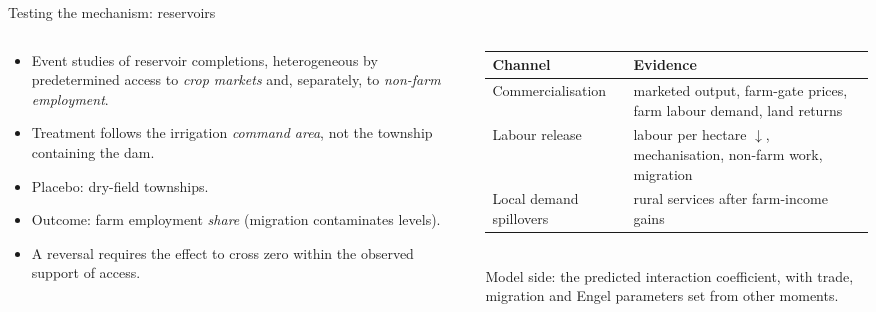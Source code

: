 \documentclass[10pt,aspectratio=169]{beamer}
\newcommand{\hl}[1]{\textcolor{mOrange}{#1}}
\begin{document}
\begin{frame}{Testing the mechanism: reservoirs}
  \small
  \begin{columns}[T]
    \begin{column}{0.5\textwidth}
      \begin{itemize}
        \item Event studies of reservoir completions, heterogeneous by \hl{predetermined}
              access to \emph{crop markets} and, separately, to \emph{non-farm employment}.
        \item Treatment follows the irrigation \emph{command area}, not the township
              containing the dam.
        \item Placebo: dry-field townships.
        \item Outcome: farm employment \emph{share} (migration contaminates levels).
        \item A reversal requires the effect to \hl{cross zero} within the observed
              support of access.
      \end{itemize}
    \end{column}
    \begin{column}{0.46\textwidth}
      \footnotesize
      \begin{tabular}{@{}L{0.3\textwidth}L{0.62\textwidth}@{}}
        \toprule
        Channel & Evidence \\
        \midrule
        Commercia\-lisation & marketed output, farm-gate prices, farm labour demand,
          land returns \\
        Labour release & labour per hectare $\downarrow$, mechanisation, non-farm work,
          migration \\
        Local demand spillovers & rural services after farm-income gains \\
        \bottomrule
      \end{tabular}\\[0.4em]
      \small Model side: the predicted interaction coefficient, with trade, migration and
      Engel parameters set from other moments.
    \end{column}
  \end{columns}
\end{frame}
\end{document}
